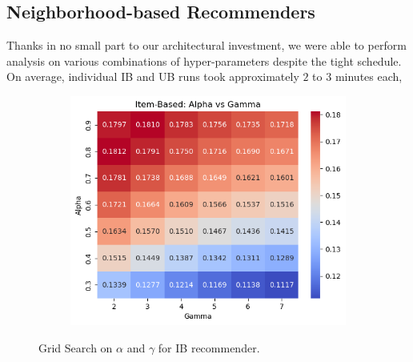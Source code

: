 \documentclass[conference]{IEEEtran}
\begin{document}
\subsection{Neighborhood-based Recommenders}

Thanks in no small part to our architectural investment, we were able to
perform analysis on various combinations of hyper-parameters despite the tight
schedule. On average,
individual IB and UB runs took approximately $2$ to $3$ minutes each,

\begin{figure}[htbp]
\centering
\begin{subfigure}{0.85\columnwidth}
  \centering
  \includegraphics[width=\columnwidth]{item-grid-search.png}
\end{subfigure}
\caption{Grid Search on $\alpha$ and $\gamma$ for IB recommender.}
\label{fig:item-grid-search}
\end{figure}
\end{document}
